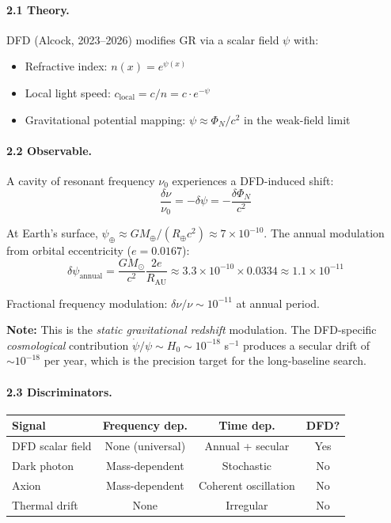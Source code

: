 \documentclass[11pt,a4paper]{article}
\begin{document}
\paragraph{2.1 Theory.} DFD (Alcock, 2023--2026) modifies GR via a scalar field $\psi$ with:
\begin{itemize}
\item Refractive index: $n(x) = e^{\psi(x)}$
\item Local light speed: $c_\mathrm{local} = c / n = c \cdot e^{-\psi}$
\item Gravitational potential mapping: $\psi \approx \Phi_N / c^2$ in the weak-field limit
\end{itemize}

\paragraph{2.2 Observable.} A cavity of resonant frequency $\nu_0$ experiences a DFD-induced shift:
\begin{equation}
\frac{\delta\nu}{\nu_0} = -\delta\psi = -\frac{\delta\Phi_N}{c^2}
\end{equation}

At Earth's surface, $\psi_\oplus \approx GM_\oplus / (R_\oplus c^2) \approx 7 \times 10^{-10}$. The annual modulation from orbital eccentricity ($e = 0.0167$):
\begin{equation}
\delta\psi_\mathrm{annual} = \frac{GM_\odot}{c^2}\frac{2e}{R_\mathrm{AU}} \approx 3.3 \times 10^{-10} \times 0.0334 \approx 1.1 \times 10^{-11}
\end{equation}

Fractional frequency modulation: $\delta\nu/\nu \sim 10^{-11}$ at annual period.

\textbf{Note:} This is the \emph{static gravitational redshift} modulation. The DFD-specific \emph{cosmological} contribution $\dot\psi/\psi \sim H_0 \sim 10^{-18}$ s$^{-1}$ produces a secular drift of $\sim 10^{-18}$ per year, which is the precision target for the long-baseline search.

\paragraph{2.3 Discriminators.}
\begin{center}
\begin{tabular}{lccc}
\toprule
\textbf{Signal} & \textbf{Frequency dep.} & \textbf{Time dep.} & \textbf{DFD?} \\
\midrule
DFD scalar field & None (universal) & Annual + secular & Yes \\
Dark photon & Mass-dependent & Stochastic & No \\
Axion & Mass-dependent & Coherent oscillation & No \\
Thermal drift & None & Irregular & No \\
\bottomrule
\end{tabular}
\end{center}
\end{document}
